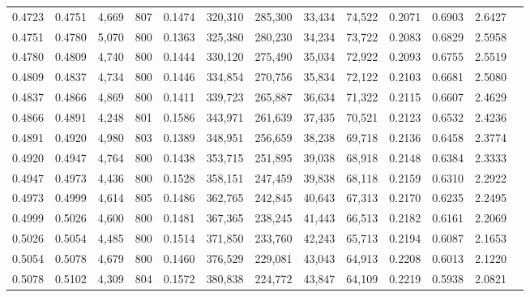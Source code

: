\begin{tabular}{rrrrrrrrrrrrr}
0.4723 & 0.4751 &  4,669 & 807 &                                     0.1474 & 320,310 & 285,300 &  33,434 &  74,522 & 0.2071 & 0.6903 & 2.6427 \\
0.4751 & 0.4780 &  5,070 & 800 &                                     0.1363 & 325,380 & 280,230 &  34,234 &  73,722 & 0.2083 & 0.6829 & 2.5958 \\
0.4780 & 0.4809 &  4,740 & 800 &                                     0.1444 & 330,120 & 275,490 &  35,034 &  72,922 & 0.2093 & 0.6755 & 2.5519 \\
0.4809 & 0.4837 &  4,734 & 800 &                                     0.1446 & 334,854 & 270,756 &  35,834 &  72,122 & 0.2103 & 0.6681 & 2.5080 \\
0.4837 & 0.4866 &  4,869 & 800 &                                     0.1411 & 339,723 & 265,887 &  36,634 &  71,322 & 0.2115 & 0.6607 & 2.4629 \\
0.4866 & 0.4891 &  4,248 & 801 &                                     0.1586 & 343,971 & 261,639 &  37,435 &  70,521 & 0.2123 & 0.6532 & 2.4236 \\
0.4891 & 0.4920 &  4,980 & 803 &                                     0.1389 & 348,951 & 256,659 &  38,238 &  69,718 & 0.2136 & 0.6458 & 2.3774 \\
0.4920 & 0.4947 &  4,764 & 800 &                                     0.1438 & 353,715 & 251,895 &  39,038 &  68,918 & 0.2148 & 0.6384 & 2.3333 \\
0.4947 & 0.4973 &  4,436 & 800 &                                     0.1528 & 358,151 & 247,459 &  39,838 &  68,118 & 0.2159 & 0.6310 & 2.2922 \\
0.4973 & 0.4999 &  4,614 & 805 &                                     0.1486 & 362,765 & 242,845 &  40,643 &  67,313 & 0.2170 & 0.6235 & 2.2495 \\
0.4999 & 0.5026 &  4,600 & 800 &                                     0.1481 & 367,365 & 238,245 &  41,443 &  66,513 & 0.2182 & 0.6161 & 2.2069 \\
0.5026 & 0.5054 &  4,485 & 800 &                                     0.1514 & 371,850 & 233,760 &  42,243 &  65,713 & 0.2194 & 0.6087 & 2.1653 \\
0.5054 & 0.5078 &  4,679 & 800 &                                     0.1460 & 376,529 & 229,081 &  43,043 &  64,913 & 0.2208 & 0.6013 & 2.1220 \\
0.5078 & 0.5102 &  4,309 & 804 &                                     0.1572 & 380,838 & 224,772 &  43,847 &  64,109 & 0.2219 & 0.5938 & 2.0821 \\

\end{tabular}
